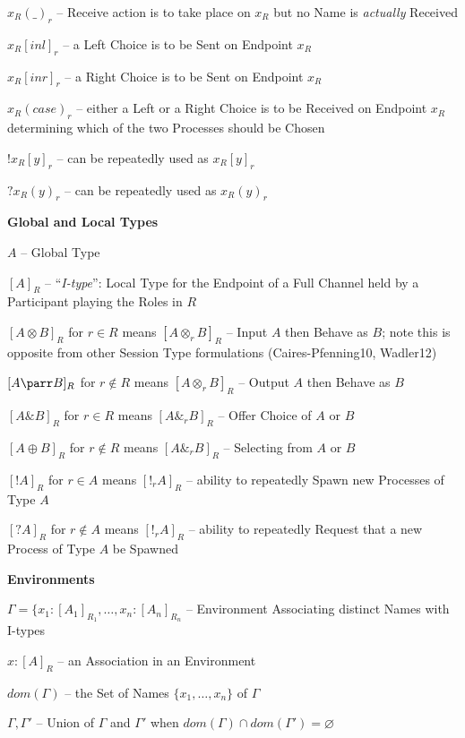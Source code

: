 $x_R(\_)_r$ -- Receive action is to take place on $x_R$ but no Name is
\emph{actually} Received

$x_R[inl]_r$ -- a Left Choice is to be Sent on Endpoint $x_R$

$x_R[inr]_r$ -- a Right Choice is to be Sent on Endpoint $x_R$

$x_R(case)_r$ -- either a Left or a Right Choice is to be Received on
Endpoint $x_R$ determining which of the two Processes should be Chosen

$!x_R[y]_r$ -- can be repeatedly used as $x_R[y]_r$

$?x_R(y)_r$ -- can be repeatedly used as $x_R(y)_r$ %


\textbf{Global and Local Types}

$A$ -- Global Type

$[A]_R$ -- ``\emph{I-type}'': Local Type for the Endpoint of a Full
Channel held by a Participant playing the Roles in $R$

$[A \otimes B]_R$ for $r \in R$ means $[A \otimes_r B]_R$ -- Input $A$
then Behave as $B$; note this is opposite from other Session Type
formulations (Caires-Pfenning10, Wadler12)

$[A \parr B]_R$ for $r \notin R$ means $[A \otimes_r B]_R$ -- Output
$A$ then Behave as $B$


$[A \& B]_R$ for $r \in R$ means $[A \&_r B]_R$ -- Offer Choice of $A$
or $B$

$[A \oplus B]_R$ for $r \notin R$ means $[A \&_r B]_R$ -- Selecting
from $A$ or $B$


$[!A]_R$ for $r \in A$ means $[!_r A]_R$ -- ability to repeatedly
Spawn new Processes of Type $A$

$[?A]_R$ for $r \notin A$ means $[!_r A]_R$ -- ability to repeatedly
Request that a new Process of Type $A$ be Spawned



\textbf{Environments}

$\Gamma = \{x_1:[A_1]_{R_1}, \ldots, x_n:[A_n]_{R_n}$ -- Environment
Associating distinct Names with I-types

$x : [A]_R$ -- an Association in an Environment

$dom(\Gamma)$ -- the Set of Names $\{x_1, \ldots, x_n\}$ of $\Gamma$

$\Gamma,\Gamma'$ -- Union of $\Gamma$ and $\Gamma'$ when $dom(\Gamma)
\cap dom(\Gamma') = \varnothing$


